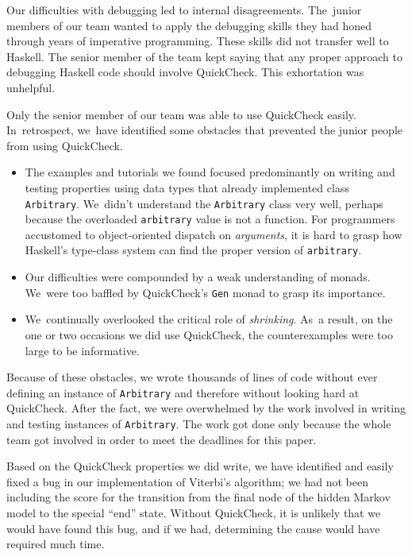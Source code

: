 \documentclass[preprint,nonatbib,blockstyle,times]{sigplanconf}
\newcommand\seclabel[1]{\label{sec:#1}}
\begin{document}
Our difficulties with debugging led to internal disagreements.
The~junior members of our team wanted to apply the debugging
skills they had honed through years of imperative programming.
These skills did not transfer well to Haskell.
The senior member of the team kept saying that any proper approach to
debugging Haskell code should involve QuickCheck.
This exhortation was unhelpful.

\seclabel{awkward-quickcheck}

Only the senior member of our team was able to use
QuickCheck easily.
In~retrospect, we~have identified some obstacles that prevented the
junior people from using
QuickCheck.
\begin{itemize}
\item
The examples and tutorials we found focused 
predominantly on writing and testing properties using data types that
already implemented class \texttt{Arbitrary}.
We~didn't understand the \texttt{Arbitrary} class very well, 
perhaps because the overloaded \texttt{arbitrary} value is not a
function.
For programmers accustomed to object-oriented dispatch
on \emph{arguments}, it is hard to grasp how Haskell's type-class
system can find the proper version
of \texttt{arbitrary}.
\item
Our difficulties were compounded by a weak understanding of monads.
We~were too baffled by QuickCheck's \texttt{Gen} monad to grasp its
importance.
\item
We~continually overlooked the critical role of \emph{shrinking}.
As~a result, on the one or two occasions we did 
use QuickCheck, the counterexamples were too large to be
informative. 
\end{itemize}
Because of these obstacles, 
we wrote thousands of lines of code without ever defining an instance
of \texttt{Arbitrary} and therefore
without looking hard at QuickCheck.
After the fact, we were overwhelmed by the work
involved in writing and testing instances
of
\texttt{Arbitrary}.
The work got done only because the whole team got involved in order to
meet the deadlines for this paper.

Based on the QuickCheck properties we did write, we have identified and
easily fixed a bug in our implementation of Viterbi's algorithm; we had not
been including the score for the transition from the final node of the hidden
Markov model to the special ``end'' state.
Without QuickCheck, it is unlikely that we would have found this bug,
and if we had, determining the cause would have required much time.
\end{document}
